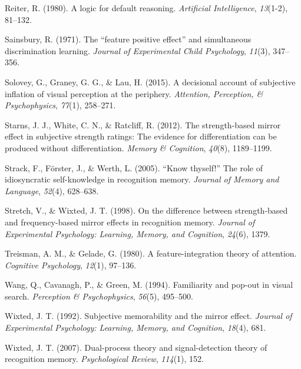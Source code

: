 \documentclass[12pt,twoside]{reedthesis}
\begin{document}
\leavevmode\hypertarget{ref-reiter1980logic}{}%
Reiter, R. (1980). A logic for default reasoning. \emph{Artificial Intelligence}, \emph{13}(1-2), 81--132.

\leavevmode\hypertarget{ref-sainsbury1971feature}{}%
Sainsbury, R. (1971). The ``feature positive effect'' and simultaneous discrimination learning. \emph{Journal of Experimental Child Psychology}, \emph{11}(3), 347--356.

\leavevmode\hypertarget{ref-solovey2015decisional}{}%
Solovey, G., Graney, G. G., \& Lau, H. (2015). A decisional account of subjective inflation of visual perception at the periphery. \emph{Attention, Perception, \& Psychophysics}, \emph{77}(1), 258--271.

\leavevmode\hypertarget{ref-starns2012strength}{}%
Starns, J. J., White, C. N., \& Ratcliff, R. (2012). The strength-based mirror effect in subjective strength ratings: The evidence for differentiation can be produced without differentiation. \emph{Memory \& Cognition}, \emph{40}(8), 1189--1199.

\leavevmode\hypertarget{ref-strack2005know}{}%
Strack, F., Förster, J., \& Werth, L. (2005). ``Know thyself!'' The role of idiosyncratic self-knowledge in recognition memory. \emph{Journal of Memory and Language}, \emph{52}(4), 628--638.

\leavevmode\hypertarget{ref-stretch1998difference}{}%
Stretch, V., \& Wixted, J. T. (1998). On the difference between strength-based and frequency-based mirror effects in recognition memory. \emph{Journal of Experimental Psychology: Learning, Memory, and Cognition}, \emph{24}(6), 1379.

\leavevmode\hypertarget{ref-treisman1980feature}{}%
Treisman, A. M., \& Gelade, G. (1980). A feature-integration theory of attention. \emph{Cognitive Psychology}, \emph{12}(1), 97--136.

\leavevmode\hypertarget{ref-wang1994familiarity}{}%
Wang, Q., Cavanagh, P., \& Green, M. (1994). Familiarity and pop-out in visual search. \emph{Perception \& Psychophysics}, \emph{56}(5), 495--500.

\leavevmode\hypertarget{ref-wixted1992subjective}{}%
Wixted, J. T. (1992). Subjective memorability and the mirror effect. \emph{Journal of Experimental Psychology: Learning, Memory, and Cognition}, \emph{18}(4), 681.

\leavevmode\hypertarget{ref-wixted2007dual}{}%
Wixted, J. T. (2007). Dual-process theory and signal-detection theory of recognition memory. \emph{Psychological Review}, \emph{114}(1), 152.
\end{document}
